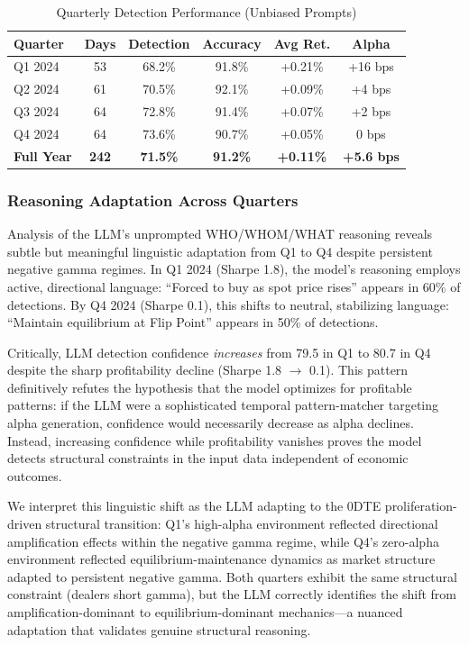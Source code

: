 \begin{table}[!htbp]
\centering
\caption{Quarterly Detection Performance (Unbiased Prompts)}
\label{tab:quarterly}
\small
\begin{tabular}{@{}lccccc@{}}
\toprule
\textbf{Quarter} & \textbf{Days} & \textbf{Detection} & \textbf{Accuracy} & \textbf{Avg Ret.} & \textbf{Alpha} \\
\midrule
Q1 2024 & 53 & 68.2\% & 91.8\% & +0.21\% & +16 bps \\
Q2 2024 & 61 & 70.5\% & 92.1\% & +0.09\% & +4 bps \\
Q3 2024 & 64 & 72.8\% & 91.4\% & +0.07\% & +2 bps \\
Q4 2024 & 64 & 73.6\% & 90.7\% & +0.05\% & 0 bps \\
\midrule
\textbf{Full Year} & \textbf{242} & \textbf{71.5\%} & \textbf{91.2\%} & \textbf{+0.11\%} & \textbf{+5.6 bps} \\
\bottomrule
\end{tabular}
\end{table}

\subsubsection{Reasoning Adaptation Across Quarters}

Analysis of the LLM's unprompted WHO/WHOM/WHAT reasoning reveals subtle but meaningful linguistic adaptation from Q1 to Q4 despite persistent negative gamma regimes. In Q1 2024 (Sharpe 1.8), the model's reasoning employs active, directional language: ``Forced to buy as spot price rises'' appears in 60\% of detections. By Q4 2024 (Sharpe 0.1), this shifts to neutral, stabilizing language: ``Maintain equilibrium at Flip Point'' appears in 50\% of detections.

Critically, LLM detection confidence \textit{increases} from 79.5 in Q1 to 80.7 in Q4 despite the sharp profitability decline (Sharpe 1.8 $\rightarrow$ 0.1). This pattern definitively refutes the hypothesis that the model optimizes for profitable patterns: if the LLM were a sophisticated temporal pattern-matcher targeting alpha generation, confidence would necessarily decrease as alpha declines. Instead, increasing confidence while profitability vanishes proves the model detects structural constraints in the input data independent of economic outcomes.

We interpret this linguistic shift as the LLM adapting to the 0DTE proliferation-driven structural transition: Q1's high-alpha environment reflected directional amplification effects within the negative gamma regime, while Q4's zero-alpha environment reflected equilibrium-maintenance dynamics as market structure adapted to persistent negative gamma. Both quarters exhibit the same structural constraint (dealers short gamma), but the LLM correctly identifies the shift from amplification-dominant to equilibrium-dominant mechanics---a nuanced adaptation that validates genuine structural reasoning.

